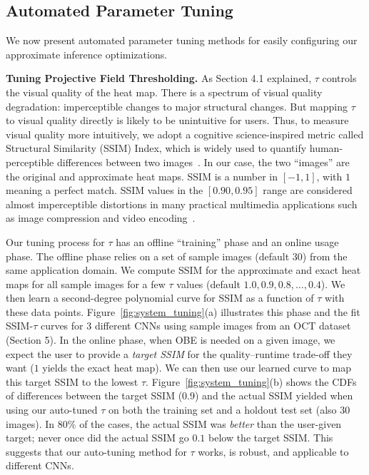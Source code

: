 \subsection{Automated Parameter Tuning}
We now present automated parameter tuning methods for easily configuring our approximate inference optimizations.

\vspace{2mm}
\noindent \textbf{Tuning Projective Field Thresholding.}
As Section 4.1 explained, $\tau$ controls the visual quality of the heat map. There is a spectrum of visual quality degradation: imperceptible changes to major structural changes. But mapping $\tau$ to visual quality directly is likely to be unintuitive for users. Thus, to measure visual quality more intuitively, we adopt a cognitive science-inspired metric called Structural Similarity (SSIM) Index, which is widely used to quantify human-perceptible differences between two images~\cite{wang2004image}. In our case, the two ``images'' are the original and approximate heat maps. SSIM is a number in $[-1,1]$, with $1$ meaning a perfect match. SSIM values in the $[0.90,0.95]$ range are considered almost imperceptible distortions in many practical multimedia applications such as image compression and video encoding~\cite{wang2004image}.

Our tuning process for $\tau$ has an offline ``training'' phase and an online usage phase. The offline phase relies on a set of sample images (default $30$) from the same application domain. We compute SSIM for the approximate and exact heat maps for all sample images for a few $\tau$ values (default $1.0, 0.9, 0.8, \dots, 0.4$). We then learn a second-degree polynomial curve for SSIM as a function of $\tau$ with these data points. Figure~\ref{fig:system_tuning}(a) illustrates this phase and the fit SSIM-$\tau$ curves for 3 different CNNs using sample images from an OCT dataset (Section 5). In the online phase, when OBE is needed on a given image, we expect the user to provide a \textit{target SSIM} for the quality--runtime trade-off they want ($1$ yields the exact heat map). We can then use our learned curve to map this target SSIM to the lowest $\tau$. Figure~\ref{fig:system_tuning}(b) shows the CDFs of differences between the target SSIM ($0.9$) and the actual SSIM yielded when using our auto-tuned $\tau$ on both the training set and a holdout test set (also $30$ images). In $80\%$ of the cases, the actual SSIM was \textit{better} than the user-given target; never once did the actual SSIM go $0.1$ below the target SSIM. This suggests that our auto-tuning method for $\tau$ works, is robust, and applicable to different CNNs.


